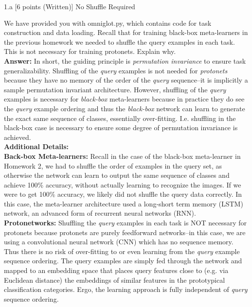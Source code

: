 \LARGE
1.a [6 points (Written)] No Shuffle Required
\normalsize
\begin{answer}

    
    We have provided you with omniglot.py, which contains code for task construction and data loading.
    Recall that for training black-box meta-learners in the previous homework we needed to shuffle the query examples in each task. This is not necessary for training protonets. Explain why.
    \\
        
    \textbf{Answer:} In short, the guiding principle is \textit{permutation invariance} to ensure task generalizability. Shuffling of the \textit{query} examples is not needed for \textit{protonets} because they have no memory of the order of the \textit{query} sequence--it is implicitly a sample permutation invariant architecture. However, shuffling of the \textit{query} examples is necessary for \textit{black-box} meta-learners because in practice they do see the \textit{query} example ordering and thus the \textit{black-box} network can learn to generate the exact same sequence of classes, essentially over-fitting. I.e. shuffling in the black-box case is necessary to ensure some degree of permutation invariance is achieved.
    \\
    
    \textbf{Additional Details:}
    \\
    \textbf{Back-box Meta-learners:} Recall in the case of the black-box meta-learner in Homework 2, we had to shuffle the order of examples in the query set, as otherwise the network can learn to output the same sequence of classes and achieve 100\% accuracy, without actually learning to recognize the images. If we were to get 100\% accuracy, we likely did not shuffle the query data correctly. In this case, the meta-learner architecture used a long-short term memory (LSTM) network, an advanced form of recurrent neural networks (RNN).
    \\
    
    \textbf{Protonetworks:} Shuffling the \textit{query} examples in each task is NOT necessary for protonets because protonets are purely feedforward networks--in this case, we are using a convolutional neural network (CNN) which has no sequence memory. Thus there is no risk of over-fitting to or even learning from the \textit{query} example sequence ordering. The query examples are simply fed through the network and mapped to an embedding space that places query features close to (e.g. via Euclidean distance) the embeddings of similar features in the prototypical classification categories. Ergo, the learning approach is fully independent of \textit{query} sequence ordering.
    \\
    

\end{answer}
